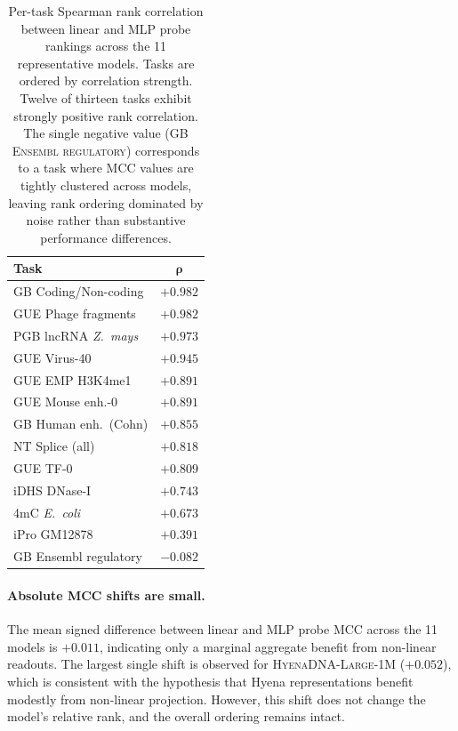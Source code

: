 \documentclass{article}
\theoremstyle{plain}
\theoremstyle{definition}
\theoremstyle{remark}
\begin{document}
\begin{table}[h]
\centering
\caption{Per-task Spearman rank correlation between linear and MLP probe
rankings across the 11 representative models. Tasks are ordered by
correlation strength. Twelve of thirteen tasks exhibit strongly positive
rank correlation. The single negative value
(\textsc{GB Ensembl regulatory}) corresponds to a task where MCC values
are tightly clustered across models, leaving rank ordering dominated by
noise rather than substantive performance differences.}
\label{tab:probe_per_task}
\small
\begin{tabular}{@{}lc@{}}
\toprule
\textbf{Task} & $\boldsymbol{\rho}$ \\
\midrule
GB Coding/Non-coding        & $+0.982$ \\
GUE Phage fragments         & $+0.982$ \\
PGB lncRNA \emph{Z.\ mays}  & $+0.973$ \\
GUE Virus-40                & $+0.945$ \\
GUE EMP H3K4me1             & $+0.891$ \\
GUE Mouse enh.-0            & $+0.891$ \\
GB Human enh.\ (Cohn)       & $+0.855$ \\
NT Splice (all)             & $+0.818$ \\
GUE TF-0                    & $+0.809$ \\
iDHS DNase-I                & $+0.743$ \\
4mC \emph{E.\ coli}         & $+0.673$ \\
iPro GM12878                & $+0.391$ \\
GB Ensembl regulatory       & $-0.082$ \\
\bottomrule
\end{tabular}
\end{table}

\paragraph{Absolute MCC shifts are small.}
The mean signed difference between linear and MLP probe MCC across the
11 models is $+0.011$, indicating only a marginal aggregate benefit from
non-linear readouts. The largest single shift is observed for
\textsc{HyenaDNA-Large-1M} ($+0.052$), which is consistent with the
hypothesis that Hyena representations benefit modestly from non-linear
projection. However, this shift does not change the model's relative
rank, and the overall ordering remains intact.
\end{document}
